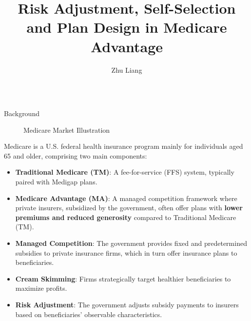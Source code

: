 \documentclass{beamer}
\title{Risk Adjustment, Self-Selection and Plan Design in Medicare Advantage}
\author{\huge Zhu Liang}
\institute{\huge Stony Brook University}
\begin{document}
\begin{frame}[t]
  \linespread{1.2}\selectfont
  \begin{columns}[t]
    \begin{column}{.25\textwidth}
      \begin{block}{Background}
        \begin{figure}[ht]
          \centering
          \scriptsize
          \resizebox{0.5\linewidth}{!}{%
          
        }
          \caption{Medicare Market Illustration}
        \end{figure}
        Medicare is a U.S. federal health insurance program mainly for individuals aged 65 and older, comprising two main components:
        \begin{itemize}
          \item \textbf{Traditional Medicare (TM)}: A fee-for-service (FFS) system, typically paired with Medigap plans.
          \item \textbf{Medicare Advantage (MA)}: A managed competition framework where private insurers, subsidized by the government, often offer plans with \textbf{lower premiums and reduced generosity} compared to Traditional Medicare (TM).
        \end{itemize}
        \begin{itemize}
          \item \textbf{Managed Competition}: The government provides fixed and predetermined subsidies to private insurance firms, which in turn offer insurance plans to beneficiaries.
          \item \textbf{Cream Skimming}: Firms strategically target healthier beneficiaries to maximize profits.
          \item \textbf{Risk Adjustment}: The government adjusts subsidy payments to insurers based on beneficiaries' observable characteristics.
        \end{itemize}
      \end{block}


\end{column}
\end{columns}
\end{frame}
\end{document}

